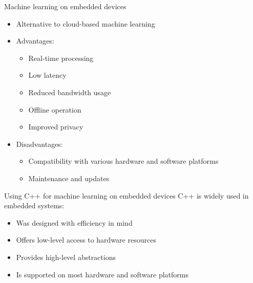 \begin{frame}{Machine learning on embedded devices}
\begin{itemize}
 \item Alternative to cloud-based machine learning
 \item Advantages:
	\begin{itemize}
	  \item Real-time processing
	  \item Low latency
	  \item Reduced bandwidth usage
	  \item Offline operation
	  \item Improved privacy
	\end{itemize}
  \item Disadvantages:
	\begin{itemize}
	  \item Compatibility with various hardware and software platforms
	  \item Maintenance and updates
	\end{itemize}
\end{itemize}
\end{frame}

\begin{frame}{Using C++ for machine learning on embedded devices}
C++ is widely used in embedded systems:
\begin{itemize}
 \item Was designed with efficiency in mind
 \item Offers low-level access to hardware resources
 \item Provides high-level abstractions
 \item Is supported on most hardware and software platforms
\end{itemize}
\end{frame}

